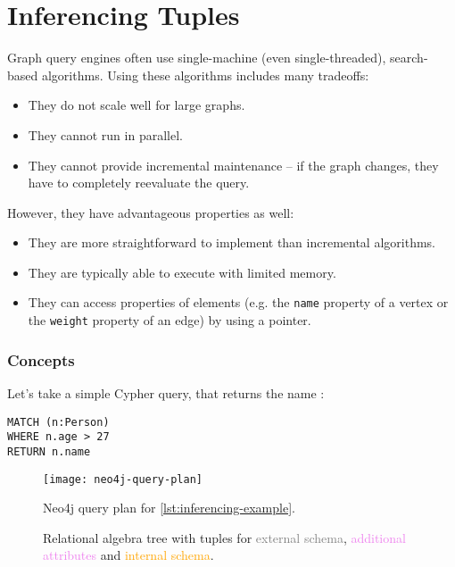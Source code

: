 \chapter{Inferencing Tuples}

Graph query engines often use single-machine (even single-threaded), search-based algorithms. Using these algorithms includes many tradeoffs:

\begin{itemize}
	\item They do not scale well for large graphs.
	\item They cannot run in parallel.
	\item They cannot provide incremental maintenance -- if the graph changes, they have to completely reevaluate the query.
\end{itemize}

However, they have advantageous properties as well:

\begin{itemize}
	\item They are more straightforward to implement than incremental algorithms.
	\item They are typically able to execute with limited memory.
	\item They can access properties of elements (e.g. the \texttt{name} property of a vertex or the \texttt{weight} property of an edge) by using a pointer.
\end{itemize}

\subsection{Concepts}

Let's take a simple Cypher query, that returns the name :

\begin{lstlisting}[label=lst:inferencing-example, caption=Example query]
MATCH (n:Person)
WHERE n.age > 27
RETURN n.name
\end{lstlisting}

\newcommand{\screenshotscale}{0.45}

\begin{figure}
	\centering
	\texttt{[image: neo4j-query-plan]}
	\caption{Neo4j query plan for \autoref{lst:inferencing-example}.}
	\label{fig:neo4-query-plan}
\end{figure}

\begin{figure}
	\centering
	
	\caption{Relational algebra tree with tuples for \textcolor{gray}{external schema}, \textcolor{violet}{additional attributes} and \textcolor{orange}{internal schema}.}
	\label{fig:example-inferencing}
\end{figure}

